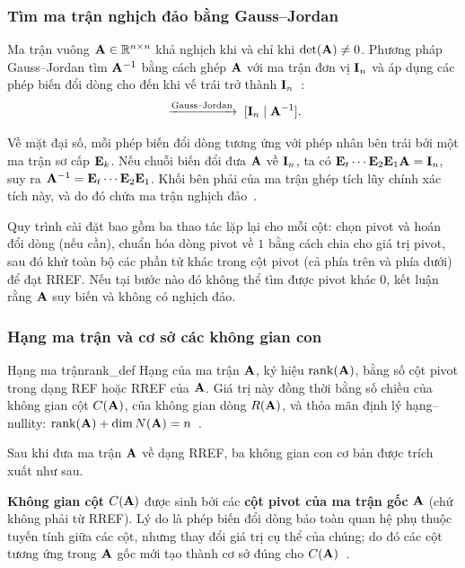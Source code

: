 \subsubsection{Tìm ma trận nghịch đảo bằng Gauss--Jordan}

Ma trận vuông $\mathbf{A} \in \mathbb{R}^{n \times n}$ khả nghịch khi và chỉ khi $\det(\mathbf{A}) \neq 0$. Phương pháp Gauss--Jordan tìm $\mathbf{A}^{-1}$ bằng cách ghép $\mathbf{A}$ với ma trận đơn vị $\mathbf{I}_n$ và áp dụng các phép biến đổi dòng cho đến khi vế trái trở thành $\mathbf{I}_n$~\cite{strang2023}:
\begin{equation}
    [\mat{A} \mid \mat{I}_n] \;\xrightarrow{\text{Gauss--Jordan}}\; [\mat{I}_n \mid \mat{A}^{-1}].
    \label{eq:inverse}
\end{equation}

Về mặt đại số, mỗi phép biến đổi dòng tương ứng với phép nhân bên trái bởi một ma trận sơ cấp $\mathbf{E}_k$. Nếu chuỗi biến đổi đưa $\mathbf{A}$ về $\mathbf{I}_n$, ta có $\mathbf{E}_t \cdots \mathbf{E}_2 \mathbf{E}_1 \mathbf{A} = \mathbf{I}_n$, suy ra $\mathbf{A}^{-1} = \mathbf{E}_t \cdots \mathbf{E}_2 \mathbf{E}_1$. Khối bên phải của ma trận ghép tích lũy chính xác tích này, và do đó chứa ma trận nghịch đảo~\cite{golub2013}.

Quy trình cài đặt bao gồm ba thao tác lặp lại cho mỗi cột: chọn pivot và hoán đổi dòng (nếu cần), chuẩn hóa dòng pivot về $1$ bằng cách chia cho giá trị pivot, sau đó khử toàn bộ các phần tử khác trong cột pivot (cả phía trên và phía dưới) để đạt RREF. Nếu tại bước nào đó không thể tìm được pivot khác $0$, kết luận rằng $\mathbf{A}$ suy biến và không có nghịch đảo.

\subsubsection{Hạng ma trận và cơ sở các không gian con}

\begin{mydef}{Hạng ma trận}{rank_def}
Hạng của ma trận $\mathbf{A}$, ký hiệu $\operatorname{rank}(\mathbf{A})$, bằng số cột pivot trong dạng REF hoặc RREF của $\mathbf{A}$. Giá trị này đồng thời bằng số chiều của không gian cột $C(\mathbf{A})$, của không gian dòng $R(\mathbf{A})$, và thỏa mãn định lý hạng--nullity: $\operatorname{rank}(\mathbf{A}) + \dim N(\mathbf{A}) = n$~\cite{strang2023}.
\end{mydef}

Sau khi đưa ma trận $\mathbf{A}$ về dạng RREF, ba không gian con cơ bản được trích xuất như sau.

\textbf{Không gian cột} $C(\mathbf{A})$ được sinh bởi các \textbf{cột pivot của ma trận gốc} $\mathbf{A}$ (chứ không phải từ RREF). Lý do là phép biến đổi dòng bảo toàn quan hệ phụ thuộc tuyến tính giữa các cột, nhưng thay đổi giá trị cụ thể của chúng; do đó các cột tương ứng trong $\mathbf{A}$ gốc mới tạo thành cơ sở đúng cho $C(\mathbf{A})$~\cite{strang2023}.

